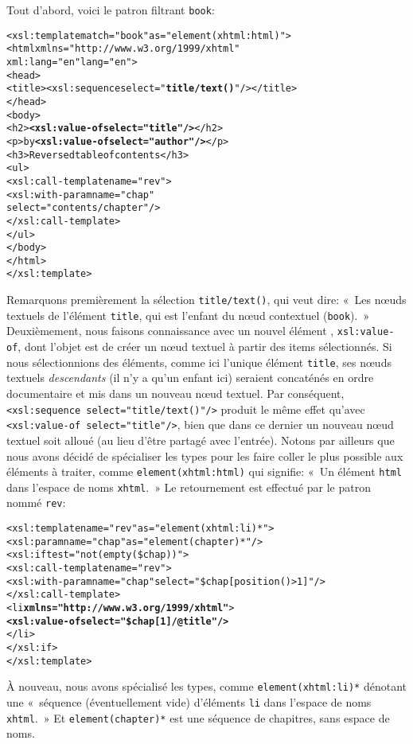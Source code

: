 \noindent Tout d'abord, voici le patron filtrant \texttt{book}:
\begin{alltt}
\small  <xsl:template match="book" as="element(xhtml:html)">
    <html xmlns="http://www.w3.org/1999/xhtml"
          xml:lang="en" lang="en">
      <head>
        <title><xsl:sequence select="\textbf{title/text()}"/></title>
      </head>
      <body>
        <h2>\textbf{<xsl:value-of select="title"/>}</h2>
        <p>by \textbf{<xsl:value-of select="author"/>}</p>
        <h3>Reversed table of contents</h3>
        <ul>
          <xsl:call-template name="rev">
            <xsl:with-param name="chap"
                            select="contents/chapter"/>
          </xsl:call-template>
        </ul>
      </body>
    </html>
  </xsl:template>
\end{alltt}
Remarquons premièrement la sélection \texttt{title/text()}, qui veut
dire: «~Les nœuds textuels de l'élément \texttt{title}, qui est
l'enfant du nœud contextuel (\texttt{book}).~» Deuxièmement, nous
faisons connaissance avec un nouvel élément \XSLT,
\texttt{xsl:value-of}, dont l'objet est de créer un nœud textuel à
partir des items sélectionnés. Si nous sélectionnions des éléments,
comme ici l'unique élément \texttt{title}, ses nœuds textuels
\emph{descendants} (il n'y a qu'un enfant ici) seraient concaténés en
ordre documentaire et mis dans un nouveau nœud textuel. Par
conséquent, \texttt{<xsl:sequence select="title/text()"/>} produit le
même effet qu'avec \texttt{<xsl:value-of select="title"/>}, bien que
dans ce dernier un nouveau nœud textuel soit alloué (au lieu d'être
partagé avec l'entrée). Notons par ailleurs que nous avons décidé de
spécialiser les types pour les faire coller le plus possible aux
éléments à traiter, comme \texttt{element(xhtml:html)} qui signifie:
«~Un élément \texttt{html} dans l'espace de noms \texttt{xhtml}.~» Le
retournement est effectué par le patron nommé \texttt{rev}:
\begin{alltt}
\small  <xsl:template name="rev" as="element(xhtml:li)*">
    <xsl:param name="chap" as="element(chapter)*"/>
    <xsl:if test="not(empty(\$chap))">
      <xsl:call-template name="rev">
        <xsl:with-param name="chap"\!\! select="\$chap[position()>1]"/>
      </xsl:call-template>
      <li \textbf{xmlns="http://www.w3.org/1999/xhtml"}>
        \textbf{<xsl:value-of select="\$chap[1]/@title"/>}
      </li>
    </xsl:if>
  </xsl:template>
\end{alltt}
À nouveau, nous avons spécialisé les types, comme
\texttt{element(xhtml:li)*} dénotant une «~séquence (éventuellement
vide) d'éléments \texttt{li} dans l'espace de noms \texttt{xhtml}.~» Et
\texttt{element(chapter)*} est une séquence de chapitres, sans espace
de noms.

